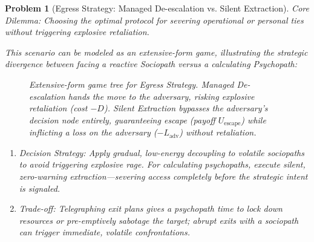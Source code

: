 \documentclass{article}
\newtheorem{problem}{Problem}
\begin{document}
\begin{problem}[Egress Strategy: Managed De-escalation vs. Silent Extraction]
	\emph{Core Dilemma:} Choosing the optimal protocol for severing operational or personal ties without triggering explosive retaliation.
	
	This scenario can be modeled as an extensive-form game, illustrating the strategic divergence between facing a reactive Sociopath versus a calculating Psychopath:
	
	\begin{figure}[H]
		\centering
		\caption{Extensive-form game tree for Egress Strategy. \emph{Managed De-escalation} hands the move to the adversary, risking explosive retaliation (cost $-D$). \emph{Silent Extraction} bypasses the adversary's decision node entirely, guaranteeing escape (payoff $U_{\text{escape}}$) while inflicting a loss on the adversary ($-L_{\text{adv}}$) without retaliation.}
	\end{figure}
	
	\begin{enumerate}[label=(\roman*)]
		\item \emph{Decision Strategy:} Apply gradual, low-energy decoupling to volatile sociopaths to avoid triggering explosive rage. For calculating psychopaths, execute \textit{silent, zero-warning extraction}---severing access completely before the strategic intent is signaled.
		\item \emph{Trade-off:} Telegraphing exit plans gives a psychopath time to lock down resources or pre-emptively sabotage the target; abrupt exits with a sociopath can trigger immediate, volatile confrontations.
	\end{enumerate}
\end{problem}
\end{document}

